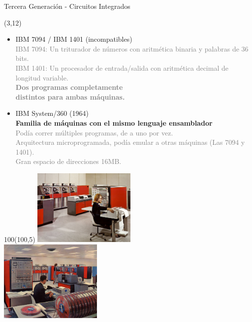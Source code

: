 \documentclass[aspectratio=169]{beamer}
\begin{document}
\begin{frame}[fragile,t]{Tercera Generación - Circuitos Integrados}
    \begin{textblock}{90}(3,12)
    \begin{itemize}
    \setlength\itemsep{0.2cm}
    \item<1-> IBM 7094 / IBM 1401 (incompatibles)\\
    \small \textcolor{gray}{ \textcolor{naranjauca}{IBM 7094}: Un triturador de números con aritmética binaria y palabras de 36 bits.\\
    \textcolor{naranjauca}{IBM 1401}: Un procesador de entrada/salida con aritmética decimal de longitud variable.\\
    \bigskip
    \textcolor{verdeuca}{\textbf{Dos programas completamente\\ distintos para ambas máquinas.}}}
    \bigskip
    \item<2-> IBM System/360 (1964)\\
    \textbf{Familia de máquinas con el mismo lenguaje ensamblador}\\ 
    \small \textcolor{gray}{
    Podía correr múltiples programas, de a uno por vez.\\
    Arquitectura microprogramada, podía emular a otras máquinas (Las 7094 y 1401).\\
    Gran espacio de direcciones 16MB.}
    \end{itemize}
    \end{textblock}
    \begin{textblock}{100}(100,5)
    \includegraphics[width=5cm]{img/IBM360.jpg}\\
    \vspace{0.1cm}
    \includegraphics[width=5cm]{img/IBM360x.jpg}\\
    \end{textblock}
\end{frame}
\end{document}
